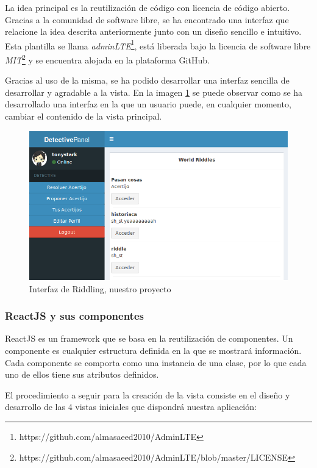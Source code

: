 La idea principal es la reutilización de código con licencia de código abierto. Gracias a la comunidad de software libre, se ha encontrado una interfaz que relacione la idea descrita anteriormente junto con un diseño sencillo e intuitivo. Esta plantilla se llama \textit{adminLTE}\footnote{https://github.com/almasaeed2010/AdminLTE}, está liberada bajo la licencia de software libre \textit{MIT}\footnote{https://github.com/almasaeed2010/AdminLTE/blob/master/LICENSE} y se encuentra alojada en la plataforma GitHub.

Gracias al uso de la misma, se ha podido desarrollar una interfaz sencilla de desarrollar y agradable a la vista. En la imagen \ref{fig::rid} se puede observar como se ha desarrollado una interfaz en la que un usuario puede, en cualquier momento, cambiar el contenido de la vista principal.

\begin{figure}[htbp]
    \centerline{\includegraphics[width=12cm]{figuras/riddling.png}}
    \caption{Interfaz de Riddling, nuestro proyecto}
    \label{fig::rid}
\end{figure}

\subsubsection{ReactJS y sus componentes}

ReactJS es un framework que se basa en la reutilización de componentes. Un componente es cualquier estructura definida en la que se mostrará información. Cada componente se comporta como una instancia de una clase, por lo que cada uno de ellos tiene sus atributos definidos.

El procedimiento a seguir para la creación de la vista consiste en el diseño y desarrollo de las 4 vistas iniciales que dispondrá nuestra aplicación:

